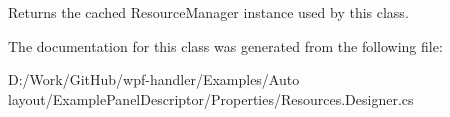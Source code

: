 Returns the cached Resource\+Manager instance used by this class. 



The documentation for this class was generated from the following file\+:\begin{DoxyCompactItemize}
\item 
D\+:/\+Work/\+Git\+Hub/wpf-\/handler/\+Examples/\+Auto layout/\+Example\+Panel\+Descriptor/\+Properties/Resources.\+Designer.\+cs\end{DoxyCompactItemize}
